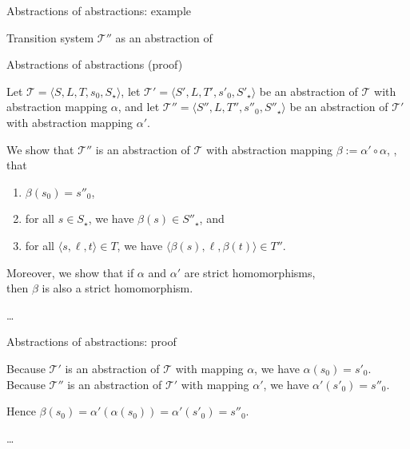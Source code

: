 \documentclass{gkibeamer}
\begin{document}
\begin{frame}{Abstractions of abstractions: example}
  \begin{center}

    \bigskip
    
    \alert{Transition system $\mathcal T''$ as an abstraction of
      }
  \end{center}
\end{frame}

\begin{frame}{Abstractions of abstractions (proof)}
  \begin{proofstart}
    Let $\mathcal T = \langle S, L, T, s_0, S_\star\rangle$,
    let $\mathcal T' = \langle S', L, T', s'_0, S'_\star\rangle$ be an
    abstraction of $\mathcal T$ with abstraction mapping $\alpha$,
    and let $\mathcal T'' = \langle S'', L, T'', s''_0, S''_\star\rangle$ be
    an abstraction of $\mathcal T'$ with abstraction mapping
    $\alpha'$.

    \smallskip

    We show that $\mathcal T''$ is an abstraction of $\mathcal T$ with
    abstraction mapping $\beta := \alpha' \circ \alpha$, \ie, that
    \begin{enumerate}
    \item $\beta(s_0) = s''_0$,
    \item for all $s \in S_\star$, we have $\beta(s) \in S''_\star$, and
    \item for all $\langle s, \ell, t\rangle \in T$, we have $\langle
      \beta(s), \ell, \beta(t)\rangle \in T''$.
    \end{enumerate}

    Moreover, we show that if $\alpha$ and $\alpha'$ are strict
    homomorphisms, \\ then $\beta$ is also a strict homomorphism.

    \medskip

    \dots
  \end{proofstart}
\end{frame}

\begin{frame}{Abstractions of abstractions: proof}
  \begin{proofmid}
    
    Because $\mathcal T'$ is an abstraction of $\mathcal T$ with
    mapping $\alpha$, we have $\alpha(s_0) = s'_0$. Because $\mathcal
    T''$ is an abstraction of $\mathcal T'$ with mapping $\alpha'$, we
    have $\alpha'(s'_0) = s''_0$.

    Hence $\beta(s_0) = \alpha'(\alpha(s_0)) = \alpha'(s'_0) = s''_0$.

    \medskip

    \dots
  \end{proofmid}
\end{frame}
\end{document}
